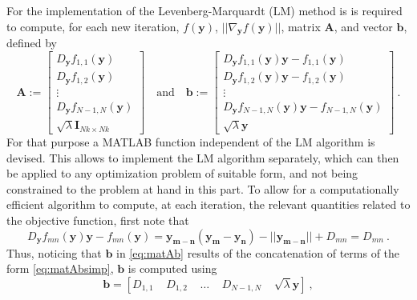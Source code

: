 \documentclass[12pt]{article}
\begin{document}
For the implementation of the Levenberg-Marquardt (LM) method is is required to compute, for each new iteration, $f(\mathbf{y})$, $||\nabla_{\mathbf{y}} f(\mathbf{y})||$, matrix $\mathbf{A}$, and vector $\mathbf{b}$, defined by
\begin{equation}\label{eq:matAb}
\mathbf{A}:= \begin{bmatrix}
D_{\mathbf{y}} f_{1,1}(\mathbf{y})\\
D_{\mathbf{y}} f_{1,2}(\mathbf{y})\\\vdots\\
D_{\mathbf{y}} f_{N-1,N}(\mathbf{y})\\
\sqrt{\lambda}\mathbf{I}_{Nk\times Nk}
\end{bmatrix}\quad \text{and} \quad \mathbf{b}:= \begin{bmatrix}
D_{\mathbf{y}} f_{1,1}(\mathbf{y})\mathbf{y}-f_{1,1}(\mathbf{y})\\
D_{\mathbf{y}} f_{1,2}(\mathbf{y})\mathbf{y}-f_{1,2}(\mathbf{y})\\\vdots\\
D_{\mathbf{y}} f_{N-1,N}(\mathbf{y})\mathbf{y}-f_{N-1,N}(\mathbf{y})\\
\sqrt{\lambda}\mathbf{y}
\end{bmatrix}\:.
\end{equation}
For that purpose a MATLAB function independent of the LM algorithm is devised. This allows to implement the LM algorithm separately, which can then be applied to any optimization problem of suitable form, and not being constrained to the problem at hand in this part. To allow for a computationally efficient algorithm to compute, at each iteration, the relevant quantities related to the objective function, first note that 
\begin{equation}\label{eq:matAbsimp}
D_{\mathbf{y}} f_{mn}(\mathbf{y})\mathbf{y}-f_{mn}(\mathbf{y}) = \mathbf{y_{m-n}}(\mathbf{y_m}-\mathbf{y_n})-||\mathbf{y_{m-n}}||+D_{mn} = D_{mn}\:.
\end{equation}
Thus, noticing that $\mathbf{b}$ in \eqref{eq:matAb} results of the concatenation of terms of the form \eqref{eq:matAbsimp}, $\mathbf{b}$ is computed using
\begin{equation}\label{eq:b}
\mathbf{b}= \left[D_{1,1}\;\;\;\;D_{1,2}\;\;\;\;\ldots \;\;\;\;D_{N-1,N}\;\;\;\; \sqrt{\lambda}\mathbf{y} \right]\:,
\end{equation}
\end{document}
